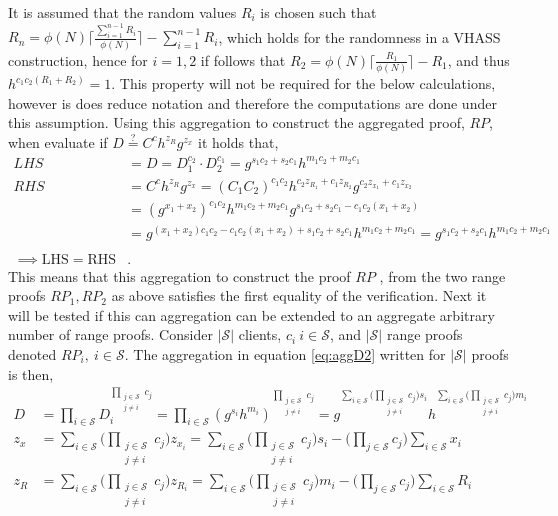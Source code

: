 It is assumed that the random values $R_i$ is chosen such that $R_n = \phi(N)\lceil \frac{\sum_{i=1}^{n-1}R_i}{\phi(N)}\rceil- \sum_{i=1}^{n-1}R_i $, which holds for the randomness in a VHASS construction, hence for $i=1,2$ if follows that $R_2 = \phi(N)\lceil \frac{R_1}{\phi(N)}\rceil- R_1$, and thus $h^{c_1c_2(R_1+R_2)} = 1$. This property will not be required for the below calculations, however is does reduce notation and therefore the computations are done under this assumption. 
Using this aggregation to construct the aggregated proof, $RP$, when evaluate if $D\overset{?}{=} C^ch^{z_R}g^{z_x}$ it holds that,
\begin{align*}
LHS &= D = D_1^{c_2}\cdot D_2^{c_1} =g^{s_1c_2+s_2c_1}h^{m_1c_2+m_2c_1} \\
RHS &= C^ch^{z_R}g^{z_x} = (C_1C_2)^{c_1c_2}h^{c_2z_{R_1}+c_1z_{R_2}}g^{c_2z_{x_1}+c_1z_{x_2}}\\ 
&=(g^{x_1 + x_2})^{c_1c_2} h^{m_1c_2 +m_2c_1} g^{s_1c_2+ s_2c_1- c_1c_2(x_1+x_2)}  \\
&= g^{(x_1+x_2)c_1c_2 - c_1c_2(x_1+x_2) +s_1c_2+s_2c_1} h^{m_1c_2 +m_2c_1} = g^{s_1c_2+s_2c_1} h^{m_1c_2 +m_2c_1} \\
\\ \implies \text{LHS} =\text{RHS}&.
\end{align*}
This means that this aggregation to construct the proof $RP$ , from the two range proofs $RP_1,RP_2$ as above satisfies the first equality of the verification. Next it will be tested if this can aggregation can be extended to an aggregate arbitrary number of range proofs. Consider $|\mathcal{S}|$ clients, $c_i\:i\in\mathcal{S}$, and $|\mathcal{S}|$ range proofs denoted $RP_i,\: i\in\mathcal{S}$. The aggregation in equation \eqref{eq:aggD2} written for $|\mathcal{S}|$ proofs is then,
\begin{equation}
\label{eq:aggDn}
\begin{aligned}
D &=\prod_{i\in\mathcal{S}}  D_i ^{\prod_{\substack{j\in\mathcal{S}\\ j\neq i}} c_j }  =  \prod_{i\in\mathcal{S}}  (g^{s_i}h^{m_i}) ^{\prod_{\substack{j\in\mathcal{S}\\ j\neq i}}  c_j } = g ^ {\sum_{i\in\mathcal{S}} \Big(\prod_{\substack{j\in\mathcal{S}\\ j\neq i}}   c_j \Big)s_i} h^ {\sum_{i\in\mathcal{S}} \Big(\prod_{\substack{j\in\mathcal{S}\\ j\neq i}}   c_j \Big)m_i} \\
z_x &= \sum_{i\in\mathcal{S}} \Big( \prod_{\substack{j\in\mathcal{S}\\ j\neq i}} c_j \Big) z_{x_i} = \sum_{i\in\mathcal{S}} \Big( \prod_{\substack{j\in\mathcal{S}\\ j\neq i}} c_j \Big)s_i - \big( \prod_{j\in\mathcal{S}} c_j \Big) \sum_{i\in\mathcal{S}} x_i\\
z_R &=  \sum_{i\in\mathcal{S}}  \Big( \prod_{\substack{j\in\mathcal{S}\\ j\neq i}} c_j \Big) z_{R_i} = \sum_{i\in\mathcal{S}} \Big( \prod_{\substack{j\in\mathcal{S}\\ j\neq i}} c_j \Big)m_i - \big( \prod_{j\in\mathcal{S}} c_j \Big) \sum_{i\in\mathcal{S}} R_i 
\end{aligned}
\end{equation}
